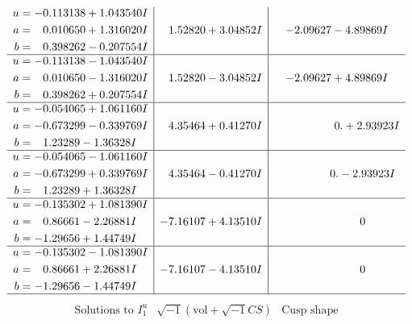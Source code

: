 \documentclass[1p]{elsarticle_modified}
\theoremstyle{definition}
\newcommand{\I}{\sqrt{-1}}
\begin{document}
$$\begin{array}{c|c|c}
\begin{aligned}
u &= -0.113138 + 1.043540 I \\
a &= \phantom{-}0.010650 + 1.316020 I \\
b &= \phantom{-}0.398262 - 0.207554 I\end{aligned}
 & \phantom{-}1.52820 + 3.04852 I & -2.09627 - 4.89869 I \\ \hline\begin{aligned}
u &= -0.113138 - 1.043540 I \\
a &= \phantom{-}0.010650 - 1.316020 I \\
b &= \phantom{-}0.398262 + 0.207554 I\end{aligned}
 & \phantom{-}1.52820 - 3.04852 I & -2.09627 + 4.89869 I \\ \hline\begin{aligned}
u &= -0.054065 + 1.061160 I \\
a &= -0.673299 - 0.339769 I \\
b &= \phantom{-}1.23289 - 1.36328 I\end{aligned}
 & \phantom{-}4.35464 + 0.41270 I & \phantom{-0.000000 -}0. + 2.93923 I \\ \hline\begin{aligned}
u &= -0.054065 - 1.061160 I \\
a &= -0.673299 + 0.339769 I \\
b &= \phantom{-}1.23289 + 1.36328 I\end{aligned}
 & \phantom{-}4.35464 - 0.41270 I & \phantom{-0.000000 } 0. - 2.93923 I \\ \hline\begin{aligned}
u &= -0.135302 + 1.081390 I \\
a &= \phantom{-}0.86661 - 2.26881 I \\
b &= -1.29656 + 1.44749 I\end{aligned}
 & -7.16107 + 4.13510 I & \phantom{-0.000000 } 0 \\ \hline\begin{aligned}
u &= -0.135302 - 1.081390 I \\
a &= \phantom{-}0.86661 + 2.26881 I \\
b &= -1.29656 - 1.44749 I\end{aligned}
 & -7.16107 - 4.13510 I & \phantom{-0.000000 } 0\\
 \hline 
 \end{array}$$\newpage$$\begin{array}{c|c|c}  
\text{Solutions to }I^u_{1}& \I (\text{vol} + \sqrt{-1}CS) & \text{Cusp shape}\\
 \hline 
\begin{aligned}

\end{aligned}
\end{array}$$
\end{document}
